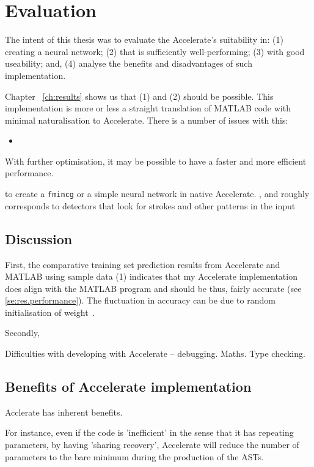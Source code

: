 \chapter{Evaluation}\label{ch:eval}

The intent of this thesis was to evaluate the Accelerate's suitability in: (1) creating a neural network; (2) that is sufficiently well-performing; (3) with good useability; and, (4) analyse the benefits and disadvantages of such implementation. 

Chapter ~\ref{ch:results} shows us that (1) and (2) should be possible. This implementation is more or less a straight translation of MATLAB code with minimal naturalisation to Accelerate. There is a number of issues with this:

\begin{itemize}
	\item
\end{itemize}

With further optimisation, it may be possible to have a faster and more efficient performance. 




to create a \texttt{fmincg} or a simple neural network in native Accelerate.
, and roughly corresponds to detectors that look for strokes and other patterns in the input~\cite{Ng12}

\section{Discussion} \label{se:eval.discuss}

First, the comparative training set prediction results from Accelerate and MATLAB using sample data (1) indicates that my Accelerate implementation does align with the MATLAB program and should be thus, fairly accurate (see \ref{se:res.performance}). The fluctuation in accuracy can be due to random initialisation of weight~\cite{Ng12}.

Secondly, 


Difficulties with developing with Accelerate -- debugging. Maths. Type checking.

\section{Benefits of Accelerate implementation} \label{se:impl.benefits}

Acclerate has inherent benefits.

For instance, even if the code is 'inefficient' in the sense that it has repeating parameters, by having 'sharing recovery', Accelerate will reduce the number of parameters to the bare minimum during the production of the ASTs.

